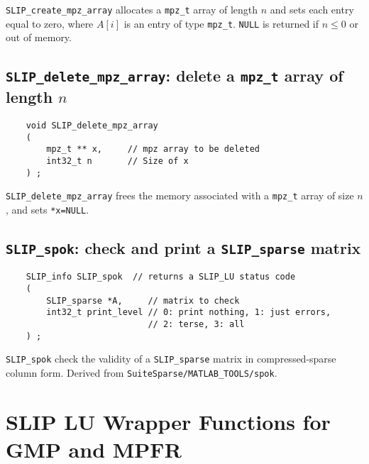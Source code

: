 \documentclass[12pt]{article}
\theoremstyle{definition}
\begin{document}
\verb|SLIP_create_mpz_array| allocates a \verb|mpz_t| array of length $n$ and
sets each entry equal to zero, where  $A[i]$ is an entry of type \verb|mpz_t|.
 \verb|NULL| is returned if
$n\le 0$ or out of memory.

\cprotect\subsection{\verb|SLIP_delete_mpz_array|: delete a \verb|mpz_t| array of length $n$}

\begin{mdframed}[userdefinedwidth=6in]
{\footnotesize
\begin{verbatim}
    void SLIP_delete_mpz_array
    (
        mpz_t ** x,     // mpz array to be deleted
        int32_t n       // Size of x
    ) ;
\end{verbatim}
} \end{mdframed}

\verb|SLIP_delete_mpz_array| frees the memory associated with a \verb|mpz_t|
array of size $n$, and sets \verb|*x=NULL|.

\cprotect\subsection{\verb|SLIP_spok|: check and print a \verb|SLIP_sparse| matrix}

\begin{mdframed}[userdefinedwidth=6in]
{\footnotesize
\begin{verbatim}
    SLIP_info SLIP_spok  // returns a SLIP_LU status code
    (
        SLIP_sparse *A,     // matrix to check
        int32_t print_level // 0: print nothing, 1: just errors,
                            // 2: terse, 3: all
    ) ;
\end{verbatim}
} \end{mdframed}

\verb|SLIP_spok| check the validity of a \verb|SLIP_sparse| matrix in compressed-sparse column form.  Derived from \verb|SuiteSparse/MATLAB_TOOLS/spok|.

\section{SLIP LU Wrapper Functions for GMP and MPFR}
\end{document}
